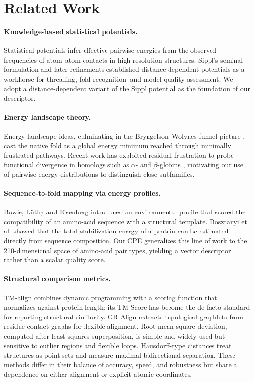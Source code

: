 \section{Related Work}

\paragraph{Knowledge-based statistical potentials.}
Statistical potentials infer effective pairwise energies from the observed frequencies of atom--atom contacts in high-resolution structures. Sippl's seminal formulation \citep{sippl1990potential} and later refinements \citep{koppensteiner1998knowledge} established distance-dependent potentials as a workhorse for threading, fold recognition, and model quality assessment. We adopt a distance-dependent variant of the Sippl potential as the foundation of our descriptor.

\paragraph{Energy landscape theory.}
Energy-landscape ideas, culminating in the Bryngelson--Wolynes funnel picture \citep{bryngelson1995wolynes}, cast the native fold as a global energy minimum reached through minimally frustrated pathways. Recent work has exploited residual frustration to probe functional divergence in homologs such as $\alpha$- and $\beta$-globins \citep{freiberger2023frustration}, motivating our use of pairwise energy distributions to distinguish close subfamilies.

\paragraph{Sequence-to-fold mapping via energy profiles.}
Bowie, L\"uthy and Eisenberg \citep{bowie1991eisenberg} introduced an environmental profile that scored the compatibility of an amino-acid sequence with a structural template. Dosztanyi et al. \citep{dosztanyi2008energy} showed that the total stabilization energy of a protein can be estimated directly from sequence composition. Our CPE generalizes this line of work to the 210-dimensional space of amino-acid pair types, yielding a vector descriptor rather than a scalar quality score.

\paragraph{Structural comparison metrics.}
TM-align \citep{zhang2005tmalign} combines dynamic programming with a scoring function that normalizes against protein length; its TM-Score has become the de-facto standard for reporting structural similarity. GR-Align \citep{maloddognin2014gralign} extracts topological graphlets from residue contact graphs for flexible alignment. Root-mean-square deviation, computed after least-squares superposition, is simple and widely used but sensitive to outlier regions and flexible loops. Hausdorff-type distances treat structures as point sets and measure maximal bidirectional separation. These methods differ in their balance of accuracy, speed, and robustness but share a dependence on either alignment or explicit atomic coordinates.

